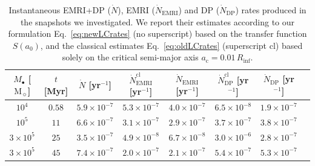 \documentclass[desactivate]{aa}
\begin{document}
    \begin{table}[]
    
        \centering
        \begin{tabular}{cccccccc}
        $M_\bullet$ [$\mathrm{M}_\sun$] & $t$ [Myr] & $\dot{N}$ [yr$^{-1}$] & $\dot{N}^\mathrm{cl}_\mathrm{EMRI}$  [yr$^{-1}$]& $\dot{N}_\mathrm{EMRI}$  [yr$^{-1}$] & $\dot{N}^\mathrm{cl}_\mathrm{DP}$  [yr$^{-1}$]& $\dot{N}_\mathrm{DP}$  [yr$^{-1}$]\\ \midrule
        $10^4$ & $0.58$ & $5.9\times10^{-7}$ & $5.3\times10^{-7}$ & $4.0\times10^{-7}$ & $6.5\times10^{-8}$ & $1.9\times 10^{-7}$\\        
        $10^5$ & $11$ & $6.6\times10^{-7}$ & $3.1\times10^{-7}$ & $2.9\times10^{-7}$ & $3.7\times10^{-7}$ & $3.8\times 10^{-7}$\\
        $3 \times 10^5$ & $25$ & $3.5\times10^{-7}$ & $4.9\times10^{-8}$ & $6.7\times10^{-8}$ & $3.0\times10^{-6}$ & $2.8\times 10^{-7}$\\
        $3 \times 10^5$ & $45$ & $7.4\times10^{-7}$ & $2.0\times10^{-7}$ & $2.1\times10^{-7}$ & $5.4\times10^{-7}$ & $5.3\times 10^{-7}$\\
        \end{tabular}
        \caption{Instantaneous EMRI+DP ($\dot{N}$), EMRI ($\dot{N}_\mathrm{EMRI}$) and DP ($\dot{N}_\mathrm{DP}$) rates produced in the snapshots we investigated. We report their estimates according to our formulation Eq.~\eqref{eq:newLCrates} (no superscript) based on the transfer function $S(a_0)$, and the classical estimates Eq.~\eqref{eq:oldLCrates} (superscript $\mathrm{cl}$) based solely on the critical semi-major axis $a_\mathrm{c} = 0.01\, R_\mathrm{inf}$.}
        \label{tab:LCrates}
    \end{table}
\end{document}
